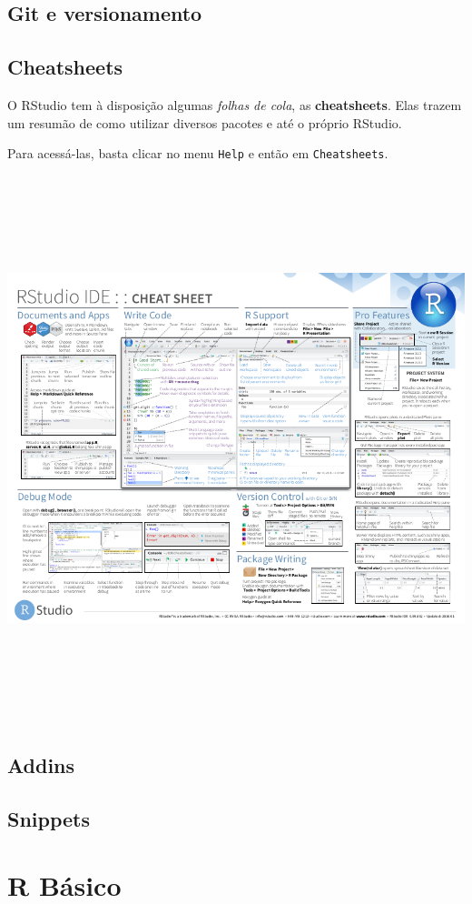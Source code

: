 \documentclass[]{book}
\begin{document}
\hypertarget{git-e-versionamento}{%
\section{Git e versionamento}\label{git-e-versionamento}}

\hypertarget{cheatsheets}{%
\section{Cheatsheets}\label{cheatsheets}}

O RStudio tem à disposição algumas \emph{folhas de cola}, as \textbf{cheatsheets}. Elas trazem um resumão de como utilizar diversos pacotes e até o próprio RStudio.

Para acessá-las, basta clicar no menu \texttt{Help} e então em \texttt{Cheatsheets}.

\begin{center}\includegraphics[width=700,height=600]{img/rstudio/cheatsheet-rstudio} \end{center}

\hypertarget{addins}{%
\section{Addins}\label{addins}}

\hypertarget{snippets}{%
\section{Snippets}\label{snippets}}

\hypertarget{r-buxe1sico}{%
\chapter{R Básico}\label{r-buxe1sico}}
\end{document}
